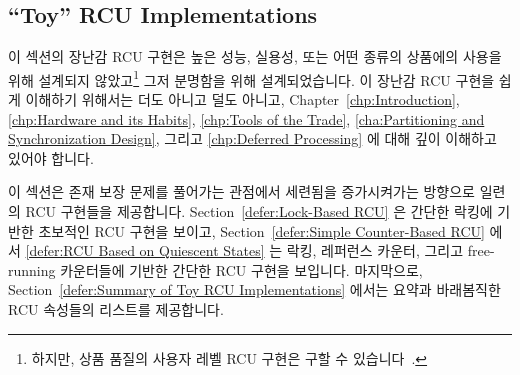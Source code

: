 
\subsection{``Toy'' RCU Implementations}
\label{sec:defer:``Toy'' RCU Implementations}

이 섹션의 장난감 RCU 구현은 높은 성능, 실용성, 또는 어떤 종류의 상품에의 사용을
위해 설계되지 않았고\footnote{
	하지만, 상품 품질의 사용자 레벨 RCU 구현은 구할 수
	있습니다~\cite{MathieuDesnoyers2009URCU}.}
그저 분명함을 위해 설계되었습니다.
이 장난감 RCU 구현을 쉽게 이해하기 위해서는 더도 아니고 덜도 아니고,
Chapter~\ref{chp:Introduction},
\ref{chp:Hardware and its Habits},
\ref{chp:Tools of the Trade},
\ref{cha:Partitioning and Synchronization Design},
그리고
\ref{chp:Deferred Processing} 에 대해 깊이 이해하고 있어야 합니다.
\iffalse

The toy RCU implementations in this section are designed not for
high performance, practicality, or any kind of production use,\footnote{
	However, production-quality user-level RCU implementations
	are available~\cite{MathieuDesnoyers2009URCU}.}
but rather for clarity.
Nevertheless, you will need a thorough understanding of
Chapters~\ref{chp:Introduction},
\ref{chp:Hardware and its Habits},
\ref{chp:Tools of the Trade},
\ref{cha:Partitioning and Synchronization Design},
and
\ref{chp:Deferred Processing}
for even these toy RCU implementations to be easily understandable.
\fi

이 섹션은 존재 보장 문제를 풀어가는 관점에서 세련됨을 증가시켜가는 방향으로
일련의 RCU 구현들을 제공합니다.
Section~\ref{defer:Lock-Based RCU} 은 간단한 락킹에 기반한 초보적인 RCU 구현을
보이고,
Section~\ref{defer:Simple Counter-Based RCU} 에서
\ref{defer:RCU Based on Quiescent States}
는 락킹, 레퍼런스 카운터, 그리고 free-running 카운터들에 기반한 간단한 RCU
구현을 보입니다.
마지막으로, Section~\ref{defer:Summary of Toy RCU Implementations} 에서는
요약과 바래봄직한 RCU 속성들의 리스트를 제공합니다.
\iffalse

This section provides a series of RCU implementations in order of
increasing sophistication, from the viewpoint of solving the
existence-guarantee problem.
Section~\ref{defer:Lock-Based RCU} presents a rudimentary
RCU implementation based on simple locking, while
Section~\ref{defer:Simple Counter-Based RCU} through
\ref{defer:RCU Based on Quiescent States}
present a series of
simple RCU implementations based on locking, reference counters,
and free-running counters.
Finally, Section~\ref{defer:Summary of Toy RCU Implementations}
provides a summary and a list of desirable RCU properties.
\fi

